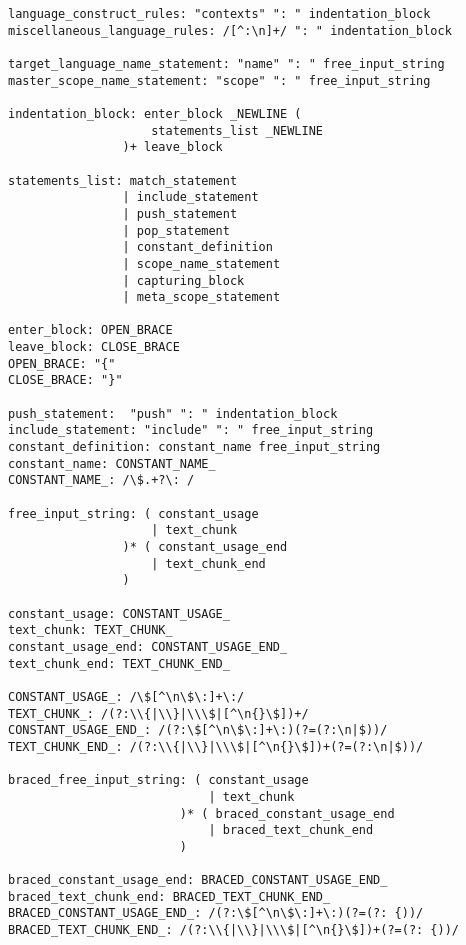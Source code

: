 \begin{lstlisting}
language_construct_rules: "contexts" ": " indentation_block
miscellaneous_language_rules: /[^:\n]+/ ": " indentation_block

target_language_name_statement: "name" ": " free_input_string
master_scope_name_statement: "scope" ": " free_input_string

indentation_block: enter_block _NEWLINE (
                    statements_list _NEWLINE
                )+ leave_block

statements_list: match_statement
                | include_statement
                | push_statement
                | pop_statement
                | constant_definition
                | scope_name_statement
                | capturing_block
                | meta_scope_statement

enter_block: OPEN_BRACE
leave_block: CLOSE_BRACE
OPEN_BRACE: "{"
CLOSE_BRACE: "}"

push_statement:  "push" ": " indentation_block
include_statement: "include" ": " free_input_string
constant_definition: constant_name free_input_string
constant_name: CONSTANT_NAME_
CONSTANT_NAME_: /\$.+?\: /

free_input_string: ( constant_usage
                    | text_chunk
                )* ( constant_usage_end
                    | text_chunk_end
                )

constant_usage: CONSTANT_USAGE_
text_chunk: TEXT_CHUNK_
constant_usage_end: CONSTANT_USAGE_END_
text_chunk_end: TEXT_CHUNK_END_

CONSTANT_USAGE_: /\$[^\n\$\:]+\:/
TEXT_CHUNK_: /(?:\\{|\\}|\\\$|[^\n{}\$])+/
CONSTANT_USAGE_END_: /(?:\$[^\n\$\:]+\:)(?=(?:\n|$))/
TEXT_CHUNK_END_: /(?:\\{|\\}|\\\$|[^\n{}\$])+(?=(?:\n|$))/

braced_free_input_string: ( constant_usage
                            | text_chunk
                        )* ( braced_constant_usage_end
                            | braced_text_chunk_end
                        )

braced_constant_usage_end: BRACED_CONSTANT_USAGE_END_
braced_text_chunk_end: BRACED_TEXT_CHUNK_END_
BRACED_CONSTANT_USAGE_END_: /(?:\$[^\n\$\:]+\:)(?=(?: {))/
BRACED_TEXT_CHUNK_END_: /(?:\\{|\\}|\\\$|[^\n{}\$])+(?=(?: {))/


\end{lstlisting}
